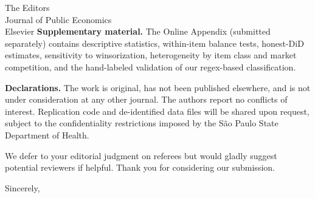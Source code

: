 \documentclass[11pt,a4paper]{letter}
\begin{document}
\begin{letter}{The Editors \\ Journal of Public Economics \\ Elsevier}
\medskip\noindent\textbf{Supplementary material.} The Online Appendix (submitted separately) contains descriptive statistics, within-item balance tests, honest-DiD estimates, sensitivity to winsorization, heterogeneity by item class and market competition, and the hand-labeled validation of our regex-based classification.

\medskip\noindent\textbf{Declarations.} The work is original, has not been published elsewhere, and is not under consideration at any other journal. The authors report no conflicts of interest. Replication code and de-identified data files will be shared upon request, subject to the confidentiality restrictions imposed by the S\~ao Paulo State Department of Health.

We defer to your editorial judgment on referees but would gladly suggest potential reviewers if helpful. Thank you for considering our submission.

\closing{Sincerely,}

\end{letter}
\end{document}
